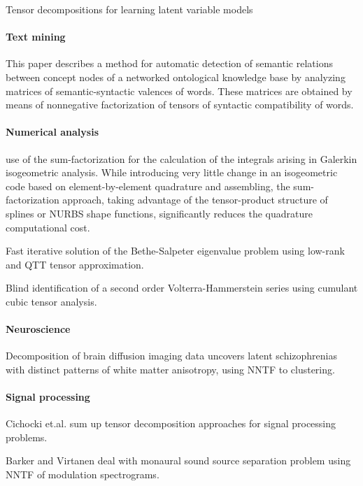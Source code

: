 \documentclass[letterpaper,12pt]{article}
\begin{document}
\cite{Anandkumar2012} Tensor decompositions for learning latent variable models

\paragraph{Text mining}

\cite{Anisimov2014} This paper describes a method for automatic detection of semantic relations between concept nodes of a networked ontological knowledge base by analyzing matrices of semantic-syntactic valences of words. These matrices are obtained by means of nonnegative factorization of tensors of syntactic compatibility of words. 


\paragraph{Numerical analysis}
 
\cite{Antolin2015} use of the sum-factorization for the calculation of the integrals arising in Galerkin isogeometric analysis. While introducing very little change in an isogeometric code based on element-by-element quadrature and assembling, the sum-factorization approach, taking advantage of the tensor-product structure of splines or NURBS shape functions, significantly reduces the quadrature computational cost.

\cite{Benner2016} Fast iterative solution of the Bethe-Salpeter eigenvalue problem using low-rank and QTT tensor approximation.


\cite{Cherif2008} Blind identification of a second order Volterra-Hammerstein series using cumulant cubic tensor analysis.

\paragraph{Neuroscience}

\cite{Arnedo2015} Decomposition of brain diffusion imaging data uncovers latent schizophrenias with distinct patterns of white matter anisotropy, using NNTF to clustering.


\paragraph{Signal processing}

Cichocki et.al. \cite{Cichocki2015} sum up tensor decomposition approaches for signal processing problems.

Barker and Virtanen \cite{Barker2014} deal with monaural sound source separation problem using NNTF of modulation spectrograms.
\end{document}
